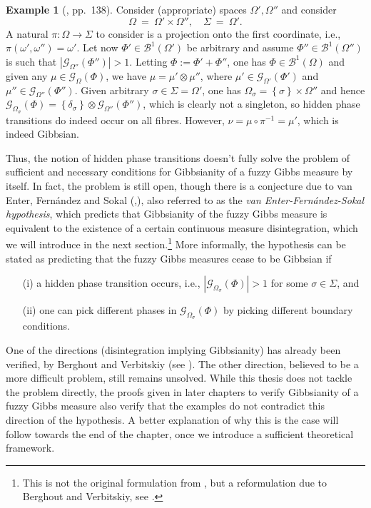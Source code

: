 \documentclass[12pt]{article}
\newcommand{\BB}{\mathscr{B}}
\newcommand{\G}{\mathcal{G}}
\newcommand{\set}[1]{\left\{#1\right\}}
\newcommand{\ra}{\rightarrow}
\newcommand{\1}{\mathbbm{1}}
\newcommand{\5}{\vspace{0.5cm}}
\theoremstyle{definition}
\newtheorem{ex}[thm]{Example}
\begin{document}
\begin{ex}[\cite{Ber}, pp.~138]
Consider (appropriate) spaces $\Omega',\Omega''$ and consider
$$\Omega~=~\Omega'\times\Omega'',\quad\Sigma~=~\Omega'.$$
A natural $\pi:\Omega\ra\Sigma$ to consider is a projection onto the first coordinate, i.e., $\pi(\omega',\omega'')=\omega'$. Let now $\Phi'\in\BB^1(\Omega')$ be arbitrary and assume $\Phi''\in\BB^1(\Omega'')$ is such that $|\G_{\Omega''}(\Phi'')|>1$. Letting $\Phi:=\Phi'+\Phi''$, one has $\Phi\in\BB^1(\Omega)$ and given any $\mu\in\G_{\Omega}(\Phi)$, we have $\mu=\mu'\otimes\mu''$, where $\mu'\in\G_{\Omega'}(\Phi')$ and $\mu''\in\G_{\Omega''}(\Phi'')$. Given arbitrary $\sigma\in\Sigma=\Omega'$, one has $\Omega_\sigma=\set{\sigma}\times\Omega''$ and hence $\G_{\Omega_\sigma}(\Phi)=\set{\delta_\sigma}\otimes\G_{\Omega''}(\Phi'')$, which is clearly not a singleton, so hidden phase transitions do indeed occur on all fibres. However, $\nu=\mu\circ\pi^{-1}=\mu'$, which is indeed Gibbsian.
\end{ex}

Thus, the notion of hidden phase transitions doesn't fully solve the problem of sufficient and necessary conditions for Gibbsianity of a fuzzy Gibbs measure by itself. In fact, the problem is still open, though there is a conjecture due to van Enter, Fern\'andez and Sokal (\cite{EFS},\cite{Ber}), also referred to as the \textit{van Enter-Fern\'andez-Sokal hypothesis}, which predicts that Gibbsianity of the fuzzy Gibbs measure is equivalent to the existence of a certain continuous measure disintegration, which we will introduce in the next section.\footnote{This is not the original formulation from \cite{EFS}, but a reformulation due to Berghout and Verbitskiy, see \cite{Ber}.}  More informally, the hypothesis can be stated as predicting that the fuzzy Gibbs measures cease to be Gibbsian if 
\begin{itemize}
	\item[(i)] a hidden phase transition occurs, i.e., $|\G_{\Omega_\sigma}(\Phi)|>1$ for some $\sigma\in\Sigma$, and
	\item[(ii)]  one can pick different phases in $\G_{\Omega_\sigma}(\Phi)$ by picking different boundary conditions.
\end{itemize}
One of the directions (disintegration implying Gibbsianity) has already been verified, by Berghout and Verbitskiy (see \cite{Ber}). The other direction, believed to be a more difficult problem, still remains unsolved. While this thesis does not tackle the problem directly, the proofs given in later chapters to verify Gibbsianity of a fuzzy Gibbs measure also verify that the examples do not contradict this direction of the hypothesis. A better explanation of why this is the case will follow towards the end of the chapter, once we introduce a sufficient theoretical framework. \\
\end{document}
